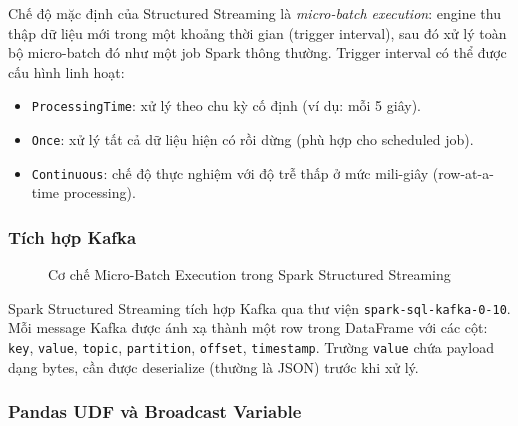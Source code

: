 Chế độ mặc định của Structured Streaming là \emph{micro-batch execution}: engine
thu thập dữ liệu mới trong một khoảng thời gian (trigger interval), sau đó xử lý
toàn bộ micro-batch đó như một job Spark thông thường. Trigger interval có thể được
cấu hình linh hoạt:

\begin{itemize}
  \item \texttt{ProcessingTime}: xử lý theo chu kỳ cố định (ví dụ: mỗi 5 giây).
  \item \texttt{Once}: xử lý tất cả dữ liệu hiện có rồi dừng (phù hợp cho
    scheduled job).
  \item \texttt{Continuous}: chế độ thực nghiệm với độ trễ thấp ở mức
    mili-giây (row-at-a-time processing).
\end{itemize}

\subsubsection{Tích hợp Kafka}

\begin{figure}[H]
  \centering
  \setlength{\fboxsep}{12pt}
  \caption{Cơ chế Micro-Batch Execution trong Spark Structured Streaming}
  \label{fig:spark-microbatch}
\end{figure}

Spark Structured Streaming tích hợp Kafka qua thư viện
\texttt{spark-sql-kafka-0-10}. Mỗi message Kafka được ánh xạ thành một row trong
DataFrame với các cột: \texttt{key}, \texttt{value}, \texttt{topic},
\texttt{partition}, \texttt{offset}, \texttt{timestamp}. Trường \texttt{value}
chứa payload dạng bytes, cần được deserialize (thường là JSON) trước khi xử lý.

\subsubsection{Pandas UDF và Broadcast Variable}

